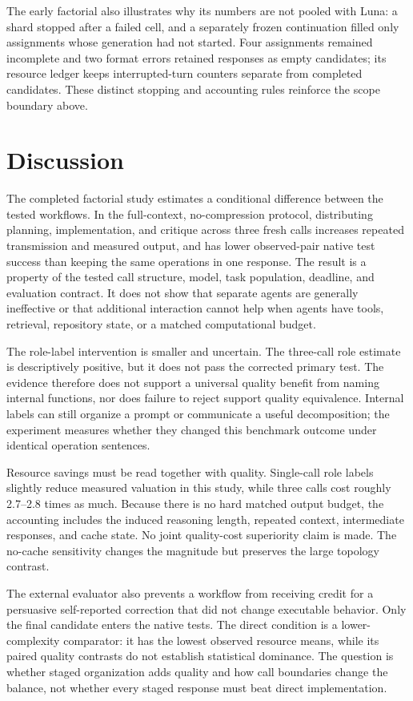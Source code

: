 The early factorial also illustrates why its numbers are not pooled with Luna: a shard stopped after a failed cell, and a separately frozen continuation filled only assignments whose generation had not started. Four assignments remained incomplete and two format errors retained responses as empty candidates; its resource ledger keeps interrupted-turn counters separate from completed candidates. These distinct stopping and accounting rules reinforce the scope boundary above.



\section{Discussion}
The completed factorial study estimates a conditional difference between the tested workflows. In the full-context, no-compression protocol, distributing planning, implementation, and critique across three fresh calls increases repeated transmission and measured output, and has lower observed-pair native test success than keeping the same operations in one response. The result is a property of the tested call structure, model, task population, deadline, and evaluation contract. It does not show that separate agents are generally ineffective or that additional interaction cannot help when agents have tools, retrieval, repository state, or a matched computational budget.

The role-label intervention is smaller and uncertain. The three-call role estimate is descriptively positive, but it does not pass the corrected primary test. The evidence therefore does not support a universal quality benefit from naming internal functions, nor does failure to reject support quality equivalence. Internal labels can still organize a prompt or communicate a useful decomposition; the experiment measures whether they changed this benchmark outcome under identical operation sentences.

Resource savings must be read together with quality. Single-call role labels slightly reduce measured valuation in this study, while three calls cost roughly 2.7--2.8 times as much. Because there is no hard matched output budget, the accounting includes the induced reasoning length, repeated context, intermediate responses, and cache state. No joint quality-cost superiority claim is made. The no-cache sensitivity changes the magnitude but preserves the large topology contrast.

The external evaluator also prevents a workflow from receiving credit for a persuasive self-reported correction that did not change executable behavior. Only the final candidate enters the native tests. The direct condition is a lower-complexity comparator: it has the lowest observed resource means, while its paired quality contrasts do not establish statistical dominance. The question is whether staged organization adds quality and how call boundaries change the balance, not whether every staged response must beat direct implementation.

